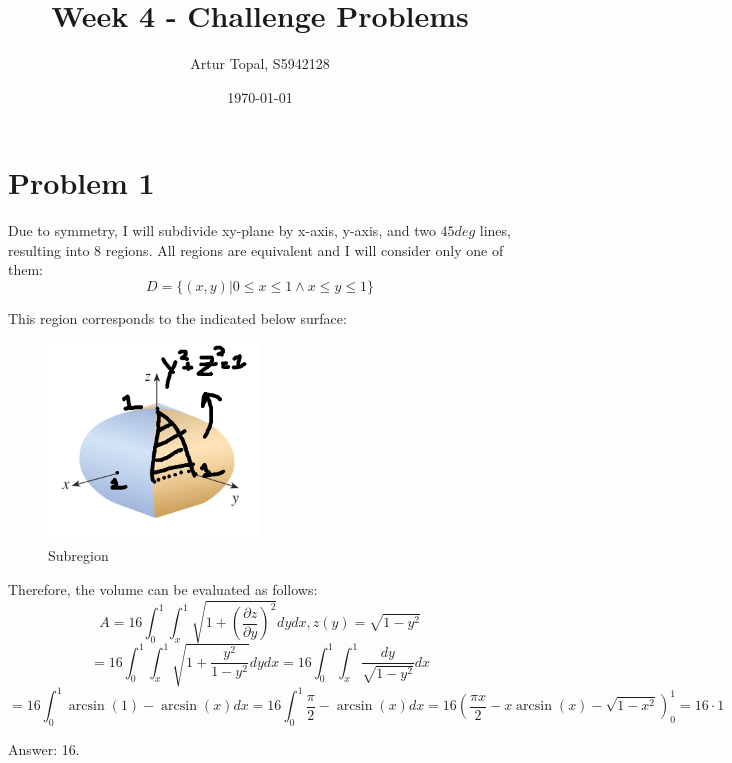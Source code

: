 \documentclass{article}
\title{Week 4 - Challenge Problems}
\author{Artur Topal, S5942128}
\date{\today}
\begin{document}
\maketitle

\pagebreak

\section { Problem 1 }
Due to symmetry, I will subdivide xy-plane by x-axis, y-axis, and two $45deg$ lines, resulting into $8$ regions. All regions are equivalent and I will consider only one of them:
\begin{equation*}
  D = \{(x, y) | 0 \le x \le 1 \wedge x \le y \le 1\}
\end{equation*}

This region corresponds to the indicated below surface:

\begin{figure}[H]
  \centering
  \includegraphics[width=0.5\textwidth]{calculus/W4/img/pr1}
  \caption{Subregion}
\end{figure}


Therefore, the volume can be evaluated as follows:
\begin{equation*}
  A = 16 \int_0^1 \int_x^1 \sqrt{1 + (\frac{\partial z}{\partial y})^2} dy dx, z(y) = \sqrt{1 - y^2}
\end{equation*}
\begin{equation*}
  = 16 \int_0^1 \int_x^1 \sqrt{1 + \frac{y^2}{1-y^2}} dy dx = 16 \int_0^1 \int_x^1 \frac{dy}{\sqrt{1-y^2}} dx
\end{equation*}
\begin{equation*}
  = 16 \int_0^1 \arcsin(1) - \arcsin(x) dx = 16 \int_0^1 \frac{\pi}{2} -  \arcsin(x) dx = 16 (\frac{\pi x}{2} - x\arcsin(x) - \sqrt{1-x^2})_0^1 = 16 \cdot 1
\end{equation*}

Answer: 16.
\end{document}
